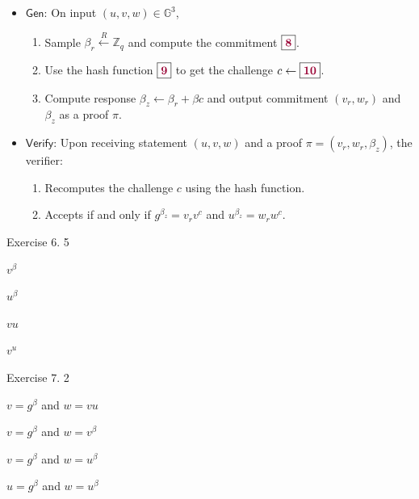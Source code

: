 \documentclass[../lecture-notes-148x210.tex]{subfiles}
\begin{document}
\begin{tcolorbox}[breakable, colback=gray!10!white,fonttitle=\bfseries,colframe=purple!80!black,title=Exercises 6-10. Non-Interactive Chaum-Pedersen Protocol.]
    \begin{itemize}
        \item $\mathsf{Gen}$: On input $(u,v,w) \in \mathbb{G}^3$, 
        \begin{enumerate}
            \item Sample $\beta_r \xleftarrow{R} \mathbb{Z}_q$ and compute the commitment $\boxed{\textcolor{purple!80!black}{\textbf{8}}}$.
            \item Use the hash function $\boxed{\textcolor{purple!80!black}{\textbf{9}}}$ to get the challenge $c \gets \boxed{\textcolor{purple!80!black}{\textbf{10}}}$.
            \item Compute response $\beta_z \gets \beta_r + \beta c$ and output commitment $(v_r,w_r)$ and $\beta_z$ as a proof $\pi$.
        \end{enumerate}
        \item $\mathsf{Verify}$: Upon receiving statement $(u,v,w)$ and a proof $\pi=(v_r,w_r,\beta_z)$, the verifier:
        \begin{enumerate}
            \item Recomputes the challenge $c$ using the hash function.
            \item Accepts if and only if $g^{\beta_z} = v_r v^c$ and $u^{\beta_z} = w_r w^c$.
        \end{enumerate}
    \end{itemize}
\end{tcolorbox}

\vspace{-1mm}

\begin{xexercise}
    {Exercise 6.}
    {}
    {5}
    {
        \item $v^{\beta}$
        \item $u^{\beta}$
        \item $vu$
        \item $v^u$
    }
\end{xexercise}

\begin{xexercise}
    {Exercise 7.}
    {}
    {2}
    {
        \item $v = g^{\beta}$ and $w = vu$
        \item $v = g^{\beta}$ and $w = v^{\beta}$
        \item $v = g^{\beta}$ and $w = u^{\beta}$
        \item $u = g^{\beta}$ and $w = u^{\beta}$
    }
\end{xexercise}
\end{document}

